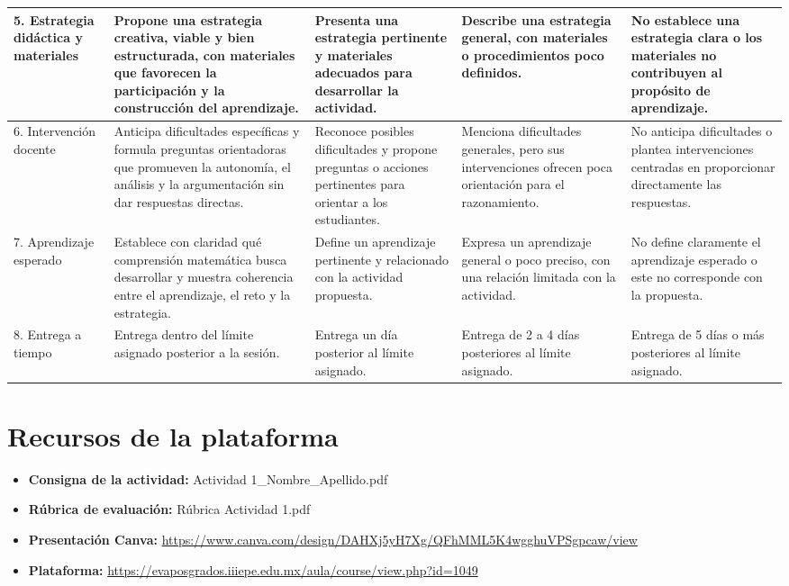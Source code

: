 \documentclass[spanish,letterpaper,oneside]{article}
\begin{document}
\begin{rubricabox}
\begin{longtable}{|p{3cm}|p{2cm}|p{2cm}|p{2cm}|p{2cm}|}
\hline
5. Estrategia didáctica y materiales & Propone una estrategia creativa, viable y bien estructurada, con materiales que favorecen la participación y la construcción del aprendizaje. & Presenta una estrategia pertinente y materiales adecuados para desarrollar la actividad. & Describe una estrategia general, con materiales o procedimientos poco definidos. & No establece una estrategia clara o los materiales no contribuyen al propósito de aprendizaje. \\
\hline
6. Intervención docente & Anticipa dificultades específicas y formula preguntas orientadoras que promueven la autonomía, el análisis y la argumentación sin dar respuestas directas. & Reconoce posibles dificultades y propone preguntas o acciones pertinentes para orientar a los estudiantes. & Menciona dificultades generales, pero sus intervenciones ofrecen poca orientación para el razonamiento. & No anticipa dificultades o plantea intervenciones centradas en proporcionar directamente las respuestas. \\
\hline
7. Aprendizaje esperado & Establece con claridad qué comprensión matemática busca desarrollar y muestra coherencia entre el aprendizaje, el reto y la estrategia. & Define un aprendizaje pertinente y relacionado con la actividad propuesta. & Expresa un aprendizaje general o poco preciso, con una relación limitada con la actividad. & No define claramente el aprendizaje esperado o este no corresponde con la propuesta. \\
\hline
8. Entrega a tiempo & Entrega dentro del límite asignado posterior a la sesión. & Entrega un día posterior al límite asignado. & Entrega de 2 a 4 días posteriores al límite asignado. & Entrega de 5 días o más posteriores al límite asignado. \\
\hline

\end{longtable}

\end{rubricabox}

\section{Recursos de la plataforma}

\begin{itemize}
  \item \textbf{Consigna de la actividad:} Actividad 1\_Nombre\_Apellido.pdf
  \item \textbf{Rúbrica de evaluación:} Rúbrica Actividad 1.pdf
  \item \textbf{Presentación Canva:} \url{https://www.canva.com/design/DAHXj5yH7Xg/QFhMML5K4wgghuVPSgpcaw/view}
  \item \textbf{Plataforma:} \url{https://evaposgrados.iiiepe.edu.mx/aula/course/view.php?id=1049}
\end{itemize}
\end{document}
